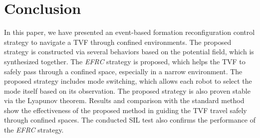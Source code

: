 \section{Conclusion}\label{sec5}
In this paper, we have presented an event-based formation reconfiguration control strategy to navigate a TVF through confined environments. The proposed strategy is constructed via several behaviors based on the potential field, which is synthesized together. The \textit{EFRC} strategy is proposed, which helps the TVF to safely pass through a confined space, especially in a narrow environment. The proposed strategy includes mode switching, which allows each robot to select the mode itself based on its observation. The proposed strategy is also proven stable via the Lyapunov theorem. Results and comparison with the standard method show the effectiveness of the proposed method in guiding the TVF travel safely through confined spaces. The conducted SIL test also confirms the performance of the \textit{EFRC} strategy.
